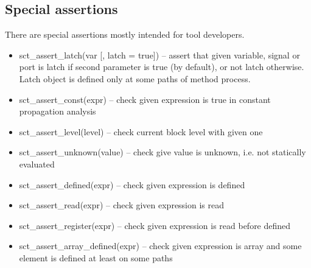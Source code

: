 \subsection{Special assertions}\label{section:assert_special}

There are special assertions mostly intended for tool developers.
\begin{itemize}
\item sct\_assert\_latch(var [, latch = true]) -- assert that given variable, signal or port is latch if second parameter is true (by default), or not latch otherwise. Latch object is defined only at some paths of method process.
\item sct\_assert\_const(expr) -- check given expression is true in constant propagation analysis
\item sct\_assert\_level(level) -- check current block level with given one
\item sct\_assert\_unknown(value) -- check give value is unknown, i.e. not statically evaluated
\item sct\_assert\_defined(expr) -- check given expression  is defined 
\item sct\_assert\_read(expr) -- check given expression is read 
\item sct\_assert\_register(expr) -- check given expression is read before defined 
\item sct\_assert\_array\_defined(expr) -- check given expression is array and some element is defined at least on some paths
\end{itemize}


